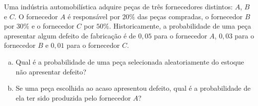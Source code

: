 %
%


\begin{exercicioBanco}[\valorquestao]
Uma indústria automobilística adquire peças de três fornecedores distintos: \(A\), \(B\) e \(C\). O fornecedor \(A\) é responsável por \(20\%\) das peças compradas, o fornecedor \(B\) por \(30\%\) e o fornecedor \(C\) por \(50\%\). Historicamente, a probabilidade de uma peça apresentar algum defeito de fabricação é de \(0{,}05\) para o fornecedor \(A\), \(0{,}03\) para o fornecedor \(B\) e \(0{,}01\) para o fornecedor \(C\).

\begin{enumerate}[(a)]
    \item Qual é a probabilidade de uma peça selecionada aleatoriamente do estoque não apresentar defeito?
    \item Se uma peça escolhida ao acaso apresentou defeito, qual é a probabilidade de ela ter sido produzida pelo fornecedor \(A\)?
\end{enumerate}
%
\end{exercicioBanco}

